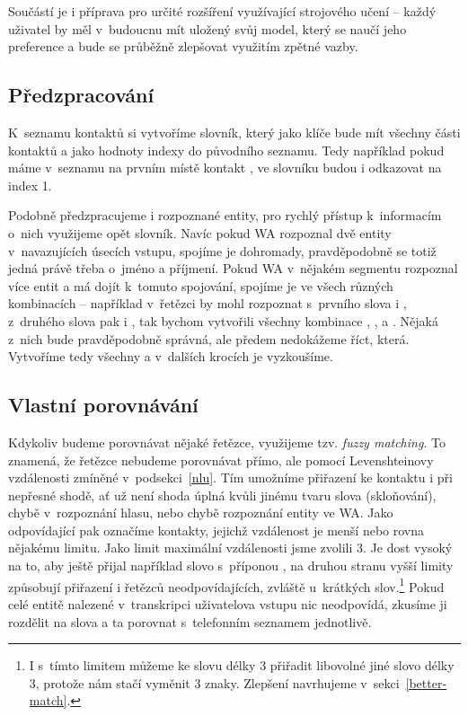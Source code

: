 Součástí je i příprava pro určité rozšíření využívající strojového učení -- každý
uživatel by měl v~budoucnu mít uložený svůj model, který se naučí jeho preference a bude se
průběžně zlepšovat využitím zpětné vazby.

\subsection{Předzpracování}\label{preprocess}

K~seznamu kontaktů si vytvoříme slovník,
který jako klíče bude mít všechny části kontaktů a jako hodnoty indexy do původního
seznamu. Tedy například pokud máme v~seznamu na prvním místě kontakt ,
ve slovníku budou  i  odkazovat na index 1.

Podobně předzpracujeme i rozpoznané entity, pro rychlý přístup k~informacím o~nich
využijeme opět slovník. Navíc pokud WA rozpoznal dvě entity v~navazujících úsecích vstupu,
spojíme je dohromady, pravděpodobně se totiž jedná právě třeba o~jméno a příjmení.
Pokud WA v~nějakém segmentu rozpoznal více entit a má dojít k~tomuto spojování, spojíme
je ve všech různých kombinacích -- například v~řetězci  by mohl
rozpoznat s~prvního slova  i , z~druhého slova pak  i
, tak bychom vytvořili všechny kombinace , ,
 a . Nějaká z~nich bude pravděpodobně správná, ale
předem nedokážeme říct, která. Vytvoříme tedy všechny a v~dalších krocích
je vyzkoušíme.

\subsection{Vlastní porovnávání}\label{subsection-matching}

Kdykoliv budeme porovnávat nějaké řetězce, využijeme tzv. \textit{fuzzy matching}.
To znamená, že řetězce nebudeme porovnávat přímo, ale pomocí Levenshteinovy vzdálenosti
zmíněné v~podsekci~\ref{nlu}. Tím umožníme přiřazení ke kontaktu i při nepřesné shodě,
ať už není shoda úplná kvůli jinému tvaru slova (skloňování), chybě v~rozpoznání
hlasu, nebo chybě rozpoznání entity ve WA. Jako odpovídající pak označíme kontakty,
jejichž vzdálenost je menší nebo rovna nějakému limitu. Jako limit maximální vzdálenosti
jsme zvolili 3. Je dost vysoký na to, aby ještě přijal například slovo s~příponou
, na druhou stranu vyšší limity způsobují přiřazení i řetězců neodpovídajících,
zvláště u~krátkých slov.\footnote{I s~tímto limitem můžeme ke slovu délky 3 přiřadit libovolné jiné
    slovo délky 3, protože nám stačí vyměnit 3 znaky. Zlepšení navrhujeme v~sekci~\ref{better-match}.}
Pokud celé entitě nalezené v~transkripci uživatelova vstupu nic neodpovídá,
zkusíme ji rozdělit na slova a ta porovnat s~telefonním seznamem jednotlivě.

